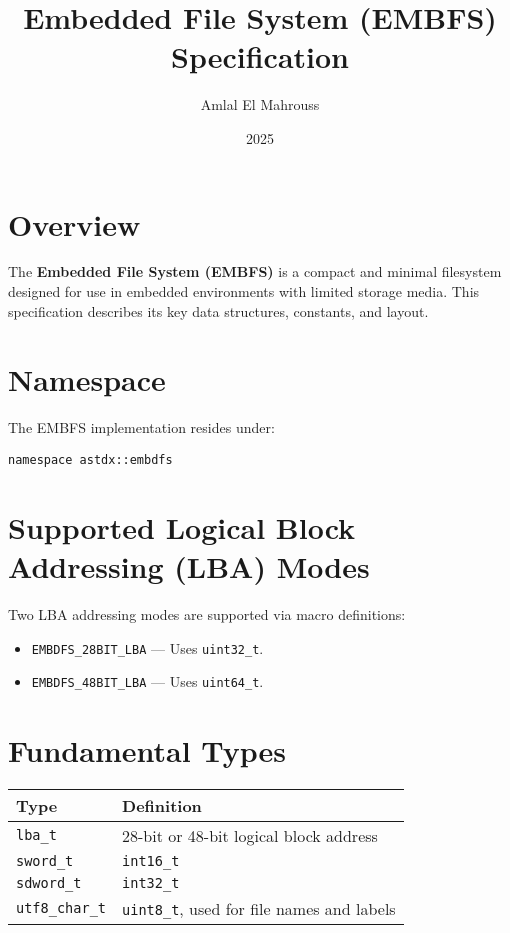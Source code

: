 \documentclass{article}
\title{Embedded File System (EMBFS) Specification}
\author{Amlal El Mahrouss}
\date{2025}
\begin{document}
\maketitle

\section{Overview}
The \textbf{Embedded File System (EMBFS)} is a compact and minimal filesystem designed for use in embedded environments with limited storage media. This specification describes its key data structures, constants, and layout.

\section{Namespace}
The EMBFS implementation resides under:
\begin{lstlisting}
namespace astdx::embdfs
\end{lstlisting}

\section{Supported Logical Block Addressing (LBA) Modes}
Two LBA addressing modes are supported via macro definitions:
\begin{itemize}
    \item \texttt{EMBDFS\_28BIT\_LBA} — Uses \texttt{uint32\_t}.
    \item \texttt{EMBDFS\_48BIT\_LBA} — Uses \texttt{uint64\_t}.
\end{itemize}

\section{Fundamental Types}
\begin{longtable}{|l|l|}
\hline
\textbf{Type} & \textbf{Definition} \\
\hline
\texttt{lba\_t} & 28-bit or 48-bit logical block address \\
\texttt{sword\_t} & \texttt{int16\_t} \\
\texttt{sdword\_t} & \texttt{int32\_t} \\
\texttt{utf8\_char\_t} & \texttt{uint8\_t}, used for file names and labels \\
\hline
\end{longtable}
\end{document}
